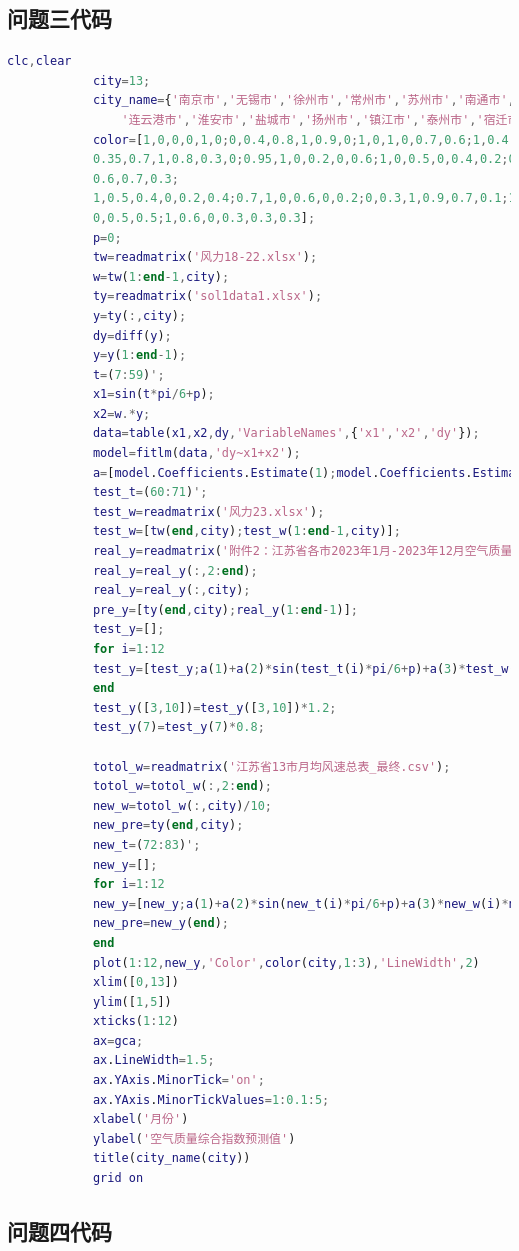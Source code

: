 \documentclass[a4paper,12pt]{article}
\begin{document}
		\subsection*{问题三代码}
		
		\begin{lstlisting}[language=Matlab, caption=问题三空气质量预测代码 (p3.m)]
			clc,clear
			city=13;
			city_name={'南京市','无锡市','徐州市','常州市','苏州市','南通市',...
				'连云港市','淮安市','盐城市','扬州市','镇江市','泰州市','宿迁市'};
			color=[1,0,0,0,1,0;0,0.4,0.8,1,0.9,0;1,0,1,0,0.7,0.6;1,0.4,0,0.5,0,0.5;
			0.35,0.7,1,0.8,0.3,0;0.95,1,0,0.2,0,0.6;1,0,0.5,0,0.4,0.2;0.8,0.6,1,
			0.6,0.7,0.3;
			1,0.5,0.4,0,0.2,0.4;0.7,1,0,0.6,0,0.2;0,0.3,1,0.9,0.7,0.1;1,0.7,0.8,
			0,0.5,0.5;1,0.6,0,0.3,0.3,0.3];
			p=0; 
			tw=readmatrix('风力18-22.xlsx');
			w=tw(1:end-1,city);
			ty=readmatrix('sol1data1.xlsx');
			y=ty(:,city);
			dy=diff(y);
			y=y(1:end-1);
			t=(7:59)';
			x1=sin(t*pi/6+p);
			x2=w.*y;
			data=table(x1,x2,dy,'VariableNames',{'x1','x2','dy'});
			model=fitlm(data,'dy~x1+x2');
			a=[model.Coefficients.Estimate(1);model.Coefficients.Estimate(2);model.Coefficients.Estimate(3)];
			test_t=(60:71)';
			test_w=readmatrix('风力23.xlsx');
			test_w=[tw(end,city);test_w(1:end-1,city)];
			real_y=readmatrix('附件2：江苏省各市2023年1月-2023年12月空气质量综合指数.xlsx');
			real_y=real_y(:,2:end);
			real_y=real_y(:,city);
			pre_y=[ty(end,city);real_y(1:end-1)];
			test_y=[];
			for i=1:12
			test_y=[test_y;a(1)+a(2)*sin(test_t(i)*pi/6+p)+a(3)*test_w(i)*pre_y(i)+pre_y(i)];
			end
			test_y([3,10])=test_y([3,10])*1.2;
			test_y(7)=test_y(7)*0.8;
			
			totol_w=readmatrix('江苏省13市月均风速总表_最终.csv');
			totol_w=totol_w(:,2:end);
			new_w=totol_w(:,city)/10;
			new_pre=ty(end,city);
			new_t=(72:83)';
			new_y=[];
			for i=1:12
			new_y=[new_y;a(1)+a(2)*sin(new_t(i)*pi/6+p)+a(3)*new_w(i)*new_pre+new_pre];
			new_pre=new_y(end);
			end
			plot(1:12,new_y,'Color',color(city,1:3),'LineWidth',2)
			xlim([0,13])
			ylim([1,5])
			xticks(1:12)
			ax=gca;
			ax.LineWidth=1.5;
			ax.YAxis.MinorTick='on';
			ax.YAxis.MinorTickValues=1:0.1:5;
			xlabel('月份')
			ylabel('空气质量综合指数预测值')
			title(city_name(city))
			grid on
		\end{lstlisting}
		
		\subsection*{问题四代码}
		
\end{document}
